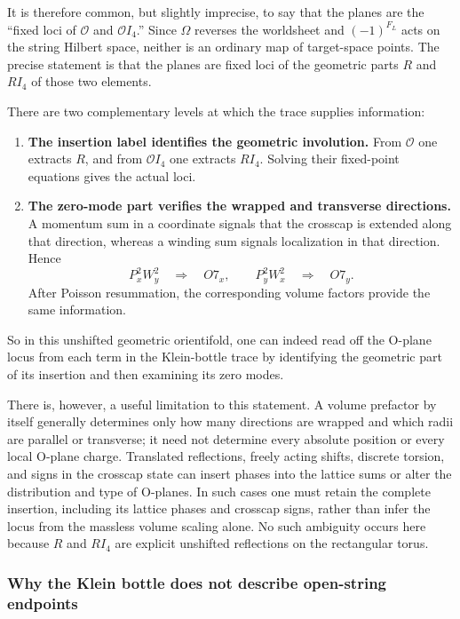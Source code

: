 \documentclass[
  10pt,
  a4paper,
  openany]{book}
\providecommand{\tightlist}{%
  \setlength{\itemsep}{0pt}\setlength{\parskip}{0pt}}
\begin{document}
It is therefore common, but slightly imprecise, to say that the planes
are the ``fixed loci of \(\mathcal O\) and \(\mathcal OI_4\).'' Since
\(\Omega\) reverses the worldsheet and \((-1)^{F_L}\) acts on the string
Hilbert space, neither is an ordinary map of target-space points. The
precise statement is that the planes are fixed loci of the geometric
parts \(R\) and \(RI_4\) of those two elements.

There are two complementary levels at which the trace supplies
information:

\begin{enumerate}
\def\labelenumi{\arabic{enumi}.}
\tightlist
\item
  \textbf{The insertion label identifies the geometric involution.} From
  \(\mathcal O\) one extracts \(R\), and from \(\mathcal OI_4\) one
  extracts \(RI_4\). Solving their fixed-point equations gives the
  actual loci.
\item
  \textbf{The zero-mode part verifies the wrapped and transverse
  directions.} A momentum sum in a coordinate signals that the crosscap
  is extended along that direction, whereas a winding sum signals
  localization in that direction. Hence \[
  P_x^2W_y^2
  \quad\Longrightarrow\quad
  O7_x,
  \qquad
  P_y^2W_x^2
  \quad\Longrightarrow\quad
  O7_y.
  \] After Poisson resummation, the corresponding volume factors provide
  the same information.
\end{enumerate}

So in this unshifted geometric orientifold, one can indeed read off the
O-plane locus from each term in the Klein-bottle trace by identifying
the geometric part of its insertion and then examining its zero modes.

There is, however, a useful limitation to this statement. A volume
prefactor by itself generally determines only how many directions are
wrapped and which radii are parallel or transverse; it need not
determine every absolute position or every local O-plane charge.
Translated reflections, freely acting shifts, discrete torsion, and
signs in the crosscap state can insert phases into the lattice sums or
alter the distribution and type of O-planes. In such cases one must
retain the complete insertion, including its lattice phases and crosscap
signs, rather than infer the locus from the massless volume scaling
alone. No such ambiguity occurs here because \(R\) and \(RI_4\) are
explicit unshifted reflections on the rectangular torus.

\subsubsection{Why the Klein bottle does not describe open-string
endpoints}\label{why-the-klein-bottle-does-not-describe-open-string-endpoints}
\end{document}
